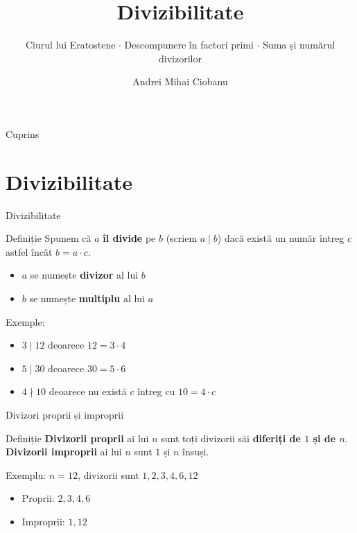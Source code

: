 \documentclass[10pt]{beamer}
\title{Divizibilitate}
\subtitle{Ciurul lui Eratostene $\cdot$ Descompunere în factori primi $\cdot$ Suma și numărul divizorilor}
\author{Andrei Mihai Ciobanu}
\institute{Algolymp Summer School}
\date{}
\begin{document}
\begin{frame}\titlepage\end{frame}

\begin{frame}{Cuprins}\tableofcontents\end{frame}

\section{Divizibilitate}

\begin{frame}{Divizibilitate}
  \begin{block}{Definiție}
    Spunem că $a$ \textbf{îl divide} pe $b$ (scriem $a \mid b$) dacă există un număr întreg $c$
    astfel încât $b = a \cdot c$.
  \end{block}
  \begin{itemize}
    \item $a$ se numește \textbf{divizor} al lui $b$
    \item $b$ se numește \textbf{multiplu} al lui $a$
  \end{itemize}
  \smallskip
  Exemple:
  \begin{itemize}
    \item $3 \mid 12$ deoarece $12 = 3 \cdot 4$
    \item $5 \mid 30$ deoarece $30 = 5 \cdot 6$
    \item $4 \nmid 10$ deoarece nu există $c$ întreg cu $10 = 4 \cdot c$
  \end{itemize}
\end{frame}

\begin{frame}{Divizori proprii și improprii}
  \begin{block}{Definiție}
    \textbf{Divizorii proprii} ai lui $n$ sunt toți divizorii săi \textbf{diferiți de $1$ și de $n$}.\\
    \textbf{Divizorii improprii} ai lui $n$ sunt $1$ și $n$ însuși.
  \end{block}
  Exemplu: $n = 12$, divizorii sunt $1, 2, 3, 4, 6, 12$
  \begin{itemize}
    \item Proprii: $2, 3, 4, 6$
    \item Improprii: $1, 12$
  \end{itemize}
\end{frame}
\end{document}
